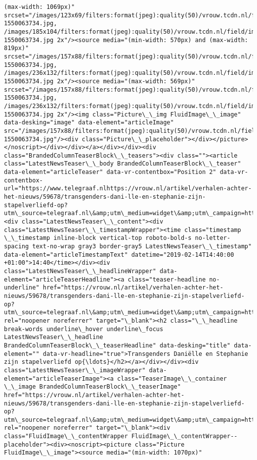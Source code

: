 \documentclass[11pt]{article}
\begin{document}
\begin{Verbatim}[commandchars=\\\{\}]
(max-width: 1069px)" srcset="/images/123x69/filters:format(jpeg):quality(50)/vrouw.tcdn.nl/field/image/5f387ec6247ab3ae90f25f43559eecdc-1550063734.jpg, /images/185x104/filters:format(jpeg):quality(50)/vrouw.tcdn.nl/field/image/5f387ec6247ab3ae90f25f43559eecdc-1550063734.jpg 2x"/><source media="(min-width: 570px) and (max-width: 819px)" srcset="/images/157x88/filters:format(jpeg):quality(50)/vrouw.tcdn.nl/field/image/5f387ec6247ab3ae90f25f43559eecdc-1550063734.jpg, /images/236x132/filters:format(jpeg):quality(50)/vrouw.tcdn.nl/field/image/5f387ec6247ab3ae90f25f43559eecdc-1550063734.jpg 2x"/><source media="(max-width: 569px)" srcset="/images/157x88/filters:format(jpeg):quality(50)/vrouw.tcdn.nl/field/image/5f387ec6247ab3ae90f25f43559eecdc-1550063734.jpg, /images/236x132/filters:format(jpeg):quality(50)/vrouw.tcdn.nl/field/image/5f387ec6247ab3ae90f25f43559eecdc-1550063734.jpg 2x"/><img class="Picture\_\_img FluidImage\_\_image" data-desking="image" data-element="articleImage" src="/images/157x88/filters:format(jpeg):quality(50)/vrouw.tcdn.nl/field/image/5f387ec6247ab3ae90f25f43559eecdc-1550063734.jpg"/><div class="Picture\_\_placeholder"></div></picture></noscript></div></div></a></div></div><div class="BrandedColumnTeaserBlock\_\_teasers"><div class=""><article class="LatestNewsTeaser\_\_body BrandedColumnTeaserBlock\_\_teaser" data-element="articleTeaser" data-vr-contentbox="Position 2" data-vr-contentbox-url="https://www.telegraaf.nlhttps://vrouw.nl/artikel/verhalen-achter-het-nieuws/59678/transgenders-dani-lle-en-stephanie-zijn-stapelverliefd-op?utm\_source=telegraaf.nl\&amp;utm\_medium=widget\&amp;utm\_campaign=https://www.telegraaf.nl/"><div class="LatestNewsTeaser\_\_content"><div class="LatestNewsTeaser\_\_timestampWrapper"><time class="timestamp \_\_timestamp inline-block vertical-top roboto-bold-s no-letter-spacing text-no-wrap gray3 border-gray5 LatestNewsTeaser\_\_timestamp" data-element="articleTimestampText" datetime="2019-02-14T14:40:00 +01:00">14:40</time></div><div class="LatestNewsTeaser\_\_headlineWrapper" data-element="articleTeaserHeadline"><a class="teaser-headline no-underline" href="https://vrouw.nl/artikel/verhalen-achter-het-nieuws/59678/transgenders-dani-lle-en-stephanie-zijn-stapelverliefd-op?utm\_source=telegraaf.nl\&amp;utm\_medium=widget\&amp;utm\_campaign=https://www.telegraaf.nl/" rel="noopener noreferrer" target="\_blank"><h2 class="\_\_headline break-words underline\_hover underline\_focus LatestNewsTeaser\_\_headline BrandedColumnTeaserBlock\_\_teaserHeadline" data-desking="title" data-element="" data-vr-headline="true">Transgenders Daniëlle en Stephanie zijn stapelverliefd op{\ldots}</h2></a></div></div><div class="LatestNewsTeaser\_\_imageWrapper" data-element="articleTeaserImage"><a class="TeaserImage\_\_container \_\_image BrandedColumnTeaserBlock\_\_teaserImage" href="https://vrouw.nl/artikel/verhalen-achter-het-nieuws/59678/transgenders-dani-lle-en-stephanie-zijn-stapelverliefd-op?utm\_source=telegraaf.nl\&amp;utm\_medium=widget\&amp;utm\_campaign=https://www.telegraaf.nl/" rel="noopener noreferrer" target="\_blank"><div class="FluidImage\_\_contentWrapper FluidImage\_\_contentWrapper--placeholder"><div><noscript><picture class="Picture FluidImage\_\_image"><source media="(min-width: 1070px)" 
\end{Verbatim}
\end{document}
